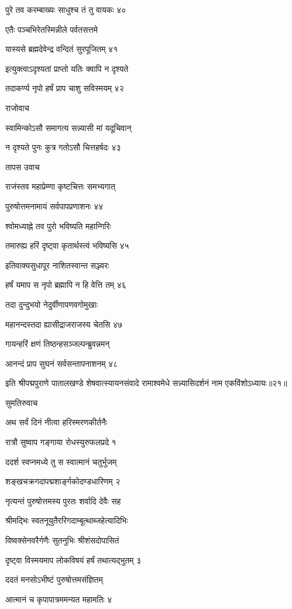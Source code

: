 पुरे तव करम्बाख्यः साधुश्च तं तु वायकः ४०

एतैः पञ्चभिरेतस्मिन्नीले पर्वतसत्तमे

यास्यसे ब्रह्मदेवेन्द्र वन्दितं सुरपूजितम् ४१

इत्युक्त्वाऽदृश्यतां प्राप्तो यतिः क्वापि न दृश्यते

तदाकर्ण्य नृपो हर्षं प्राप चाशु सविस्मयम् ४२

राजोवाच

स्वामिन्कोऽसौ समागत्य सन्न्यासी मां यदूचिवान्

न दृश्यते पुनः कुत्र गतोऽसौ चित्तहर्षदः ४३

तापस उवाच

राजंस्तव महाप्रेम्णा कृष्टचित्तः समभ्यगात्

पुरुषोत्तमनामायं सर्वपापप्रणाशनः ४४

श्वोमध्याह्ने तव पुरो भविष्यति महान्गिरिः

तमारुह्य हरिं दृष्ट्वा कृतार्थस्त्वं भविष्यसि ४५

इतिवाक्यसुधापूर नाशितस्वान्त सञ्ज्वरः

हर्षं यमाप स नृपो ब्रह्मापि न हि वेत्ति तम् ४६

तदा दुन्दुभयो नेदुर्वीणापणवगोमुखाः

महानन्दस्तदा ह्यासीद्राजराजस्य चेतसि ४७

गायन्हरिं क्षणं तिष्ठन्हसञ्जल्पन्ब्रुवन्नमन्

आनन्दं प्राप सुघनं सर्वसन्तापनाशनम् ४८

इति श्रीपद्मपुराणे पातालखण्डे शेषवात्स्यायनसंवादे रामाश्वमेधे सन्न्यासिदर्शनं नाम एकविंशोऽध्यायः॥२१॥


सुमतिरुवाच

अथ सर्वं दिनं नीत्वा हरिस्मरणकीर्तनैः

रात्रौ सुष्वाप गङ्गाया रोधस्युरुफलप्रदे १

ददर्श स्वप्नमध्ये तु स स्वात्मानं चतुर्भुजम्

शङ्खचक्रगदापद्मशार्ङ्गकोदण्डधारिणम् २

नृत्यन्तं पुरुषोत्तमस्य पुरतः शर्वादि देवैः सह

श्रीमद्भिः स्वतनूयुतैररिगदाम्बूत्थाब्जहेत्यादिभिः

विष्वक्सेनवरैर्गणैः सुतनुभिः श्रीशंसदोपासितं

दृष्ट्वा विस्मयमाप लोकविषयं हर्षं तथात्यद्भुतम् ३

ददतं मनसोऽभीष्टं पुरुषोत्तमसंज्ञितम्

आत्मानं च कृपापात्रममन्यत महामतिः ४

